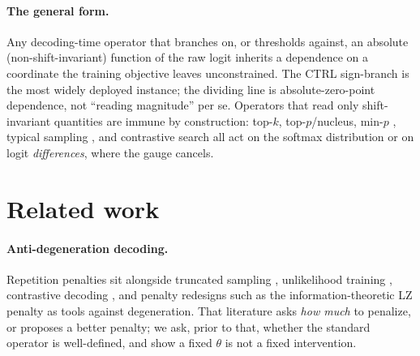 \documentclass[11pt]{article}
\newcommand{\thp}{\theta}
\begin{document}
\paragraph{The general form.} Any decoding-time operator that branches on, or thresholds
against, an absolute (non-shift-invariant) function of the raw logit inherits a dependence on a
coordinate the training objective leaves unconstrained. The CTRL sign-branch is the most widely
deployed instance;
the dividing line is absolute-zero-point dependence, not ``reading magnitude'' per se. Operators
that read only shift-invariant quantities are immune by construction: top-$k$, top-$p$/nucleus,
min-$p$ \citep{nguyen2024minp}, typical sampling \citep{meister2023typical}, and contrastive
search \citep{su2023contrastive} all act on the softmax distribution or on logit
\emph{differences}, where the gauge cancels.

\section{Related work}
\label{sec:related}

\paragraph{Anti-degeneration decoding.} Repetition penalties sit alongside truncated sampling
\citep{fan2018hierarchical,holtzman2020curious}, unlikelihood training
\citep{welleck2020unlikelihood}, contrastive decoding \citep{su2022contrastive}, and penalty
redesigns such as the information-theoretic LZ penalty \citep{ginart2025lz} as tools against
degeneration. That literature asks \emph{how much} to penalize, or proposes a better penalty; we
ask, prior to that, whether the standard operator is well-defined, and show a fixed $\thp$ is
not a fixed intervention.
\end{document}
